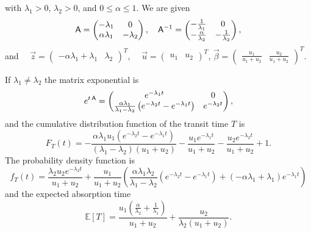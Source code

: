 \documentclass[smallextended]{svjour3}
\newcommand{\E}{\mathbb{E}}
\begin{document}
with $\lambda_1>0$, $\lambda_2>0$, and $0\leq\alpha\leq1$. We are given
\[
    \mathsf{A} = \left(\begin{matrix}- \lambda_{1} & 0\\\alpha \lambda_{1} & - \lambda_{2}\end{matrix}\right),\quad \mathsf{A}^{-1} = \left(\begin{matrix}- \frac{1}{\lambda_{1}} & 0\\- \frac{\alpha}{\lambda_{2}} & - \frac{1}{\lambda_{2}}\end{matrix}\right),
\]
and $\quad \vec{z} = \left(\begin{matrix}- \alpha \lambda_{1} + \lambda_{1} & \lambda_{2}\end{matrix}\right)^T$, $\quad \vec{u}=\left(\begin{matrix}u_{1} & u_{2}\end{matrix}\right)^T$, $\vec{\beta}=\left(\begin{matrix}\frac{u_{1}}{u_{1} + u_{2}} & \frac{u_{2}}{u_{1} + u_{2}}\end{matrix}\right)^T$.

If $\lambda_1\neq\lambda_2$ the matrix exponential is
\[
    e^{t\,\mathsf{A}} = \left(\begin{matrix}e^{- \lambda_{1} t} & 0\\\frac{\alpha \lambda_{1}}{\lambda_{1} - \lambda_{2}} \left(e^{- \lambda_{2} t} - e^{- \lambda_{1} t}\right) & e^{- \lambda_{2} t}\end{matrix}\right),
\]
and the cumulative distribution function of the transit time $T$ is
\[
    F_T(t) = - \frac{\alpha \lambda_{1} u_{1} \left(e^{- \lambda_{2} t} - e^{- \lambda_{1} t}\right)}{\left(\lambda_{1} - \lambda_{2}\right) \left(u_{1} + u_{2}\right)} - \frac{u_{1} e^{- \lambda_{1} t}}{u_{1} + u_{2}} - \frac{u_{2} e^{- \lambda_{2} t}}{u_{1} + u_{2}} + 1.
\]
The probability density function is
\[
    f_T(t) = \frac{\lambda_{2} u_{2} e^{- \lambda_{2} t}}{u_{1} + u_{2}} + \frac{u_{1}}{u_{1} + u_{2}} \left(\frac{\alpha \lambda_{1} \lambda_{2}}{\lambda_{1} - \lambda_{2}} \left(e^{- \lambda_{2} t} - e^{- \lambda_{1} t}\right) + \left(- \alpha \lambda_{1} + \lambda_{1}\right) e^{- \lambda_{1} t}\right)
\]
and the expected absorption time
\[
    \E[T] = \frac{u_{1} \left(\frac{\alpha}{\lambda_{2}} + \frac{1}{\lambda_{1}}\right)}{u_{1} + u_{2}} + \frac{u_{2}}{\lambda_{2} \left(u_{1} + u_{2}\right)}.
\]
\end{document}
